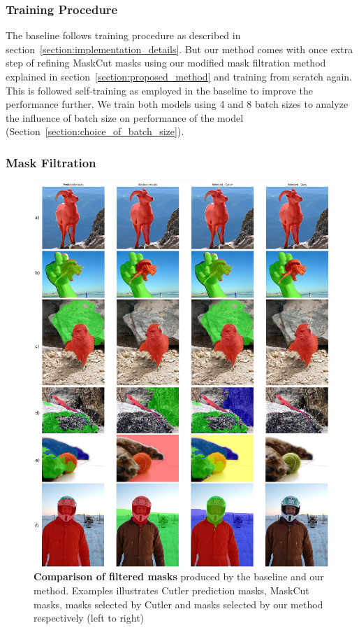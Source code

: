 \subsubsection{Training Procedure}
The baseline follows training procedure as described in section~\ref{section:implementation_details}. But our method comes with once extra step of refining MaskCut masks using our modified mask filtration method explained in section~\ref{section:proposed_method} and training from scratch again. This is followed self-training as employed in the baseline to improve the performance further. We train both models using 4 and 8 batch sizes to analyze the influence of batch size on performance of the model (Section~\ref{section:choice_of_batch_size}). 

\subsubsection{Mask Filtration}

\begin{figure}
	\centering
	\includegraphics[width=1\textwidth]{Images/main/filtered_mask_comparison.png}
	\caption[\textbf{Mask Filtration Outputs - Baseline vs Ours}]{\textbf{Comparison of filtered masks} produced by the baseline and our method. Examples illustrates Cutler prediction masks, MaskCut masks, masks selected by Cutler and masks selected by our method respectively (left to right)}
	\label{fig:filtered_mask_comparison}
\end{figure}

